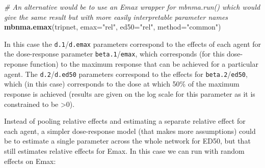 \documentclass[]{article}
\newenvironment{Shaded}{\begin{snugshade}}{\end{snugshade}}
\newcommand{\CommentTok}[1]{\textcolor[rgb]{0.56,0.35,0.01}{\textit{#1}}}
\newcommand{\DataTypeTok}[1]{\textcolor[rgb]{0.13,0.29,0.53}{#1}}
\newcommand{\KeywordTok}[1]{\textcolor[rgb]{0.13,0.29,0.53}{\textbf{#1}}}
\newcommand{\NormalTok}[1]{#1}
\newcommand{\StringTok}[1]{\textcolor[rgb]{0.31,0.60,0.02}{#1}}
\begin{document}
\begin{Shaded}
\begin{Highlighting}[]
\CommentTok{# An alternative would be to use an Emax wrapper for mbnma.run() which would give the same result but with more easily interpretable parameter names}
\KeywordTok{mbnma.emax}\NormalTok{(tripnet, }\DataTypeTok{emax=}\StringTok{"rel"}\NormalTok{, }\DataTypeTok{ed50=}\StringTok{"rel"}\NormalTok{, }\DataTypeTok{method=}\StringTok{"common"}\NormalTok{)}
\end{Highlighting}
\end{Shaded}

In this case the \texttt{d.1}/\texttt{d.emax} parameters correspond to
the effects of each agent for the dose-response parameter
\texttt{beta.1}/\texttt{emax}, which corresponds (for this dose-reponse
function) to the maximum response that can be achieved for a particular
agent. The \texttt{d.2}/\texttt{d.ed50} parameters correspond to the
effects for \texttt{beta.2}/\texttt{ed50}, which (in this case)
corresponds to the dose at which 50\% of the maximum response is
achieved (results are given on the log scale for this parameter as it is
constrained to be \textgreater0).

Instead of pooling relative effects and estimating a separate relative
effect for each agent, a simpler dose-response model (that makes more
assumptions) could be to estimate a single parameter across the whole
network for ED50, but that still estimates relative effects for Emax. In
this case we can run with random effects on Emax:
\end{document}
